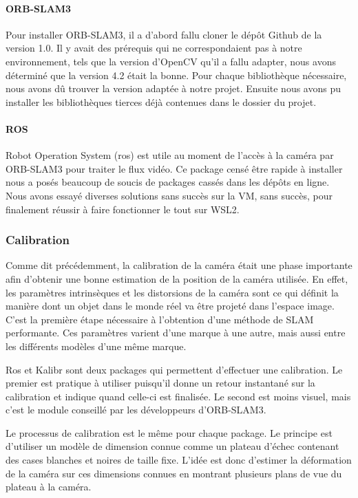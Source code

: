 \documentclass[11pt]{article}
\begin{document}
        \paragraph{ORB-SLAM3}
          Pour installer ORB-SLAM3, il a d'abord fallu cloner le dépôt Github de la version 1.0. 
          Il y avait des prérequis qui ne correspondaient pas à notre environnement, tels que la version d'OpenCV qu'il a fallu adapter,
          nous avons déterminé que la version 4.2 était la bonne. Pour chaque bibliothèque nécessaire, nous avons dû trouver la version
          adaptée à notre projet. Ensuite nous avons pu installer les bibliothèques tierces déjà contenues dans le dossier du projet.        

        \paragraph{ROS}
          Robot Operation System (\acrshort{ros}) est utile au moment de l'accès à la caméra par ORB-SLAM3 pour traiter le flux vidéo.
          Ce package censé être rapide à installer nous a posés beaucoup de soucis de packages cassés dans les dépôts en ligne. Nous avons 
          essayé diverses solutions sans succès sur la VM, sans succès, pour finalement réussir à faire fonctionner le tout sur WSL2. 

      \subsubsection{Calibration}
        Comme dit précédemment, la calibration de la caméra était une phase importante afin d'obtenir une bonne estimation de la position
        de la caméra utilisée. En effet, les paramètres intrinsèques et les distorsions de la caméra sont ce qui définit la manière dont 
        un objet dans le monde réel va être projeté dans l'espace image. C'est la première étape nécessaire à l'obtention d'une méthode de 
        SLAM performante. Ces paramètres varient d'une marque à une autre, mais aussi entre les différents modèles d'une même marque.

        Ros et Kalibr sont deux packages qui permettent d'effectuer une calibration. Le premier est pratique à utiliser puisqu'il donne un 
        retour instantané sur la calibration et indique quand celle-ci est finalisée. Le second est moins visuel, mais c'est le module 
        conseillé par les développeurs d'ORB-SLAM3.

        Le processus de calibration est le même pour chaque package. Le principe est d'utiliser un modèle de dimension connue comme
        un plateau d'échec contenant des cases blanches et noires de taille fixe. L'idée est donc d'estimer la déformation de la caméra
        sur ces dimensions connues en montrant plusieurs plans de vue du plateau à la caméra.           
\end{document}
